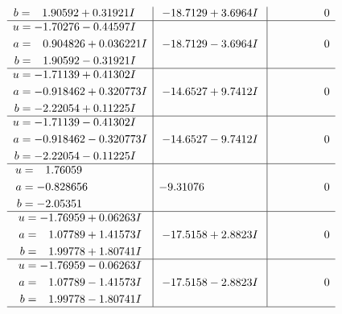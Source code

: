 \documentclass[1p]{elsarticle_modified}
\theoremstyle{definition}
\begin{document}
$$\begin{array}{c|c|c}
\begin{aligned}
b &= \phantom{-}1.90592 + 0.31921 I\end{aligned}
 & -18.7129 + 3.6964 I & \phantom{-0.000000 } 0 \\ \hline\begin{aligned}
u &= -1.70276 - 0.44597 I \\
a &= \phantom{-}0.904826 + 0.036221 I \\
b &= \phantom{-}1.90592 - 0.31921 I\end{aligned}
 & -18.7129 - 3.6964 I & \phantom{-0.000000 } 0 \\ \hline\begin{aligned}
u &= -1.71139 + 0.41302 I \\
a &= -0.918462 + 0.320773 I \\
b &= -2.22054 + 0.11225 I\end{aligned}
 & -14.6527 + 9.7412 I & \phantom{-0.000000 } 0 \\ \hline\begin{aligned}
u &= -1.71139 - 0.41302 I \\
a &= -0.918462 - 0.320773 I \\
b &= -2.22054 - 0.11225 I\end{aligned}
 & -14.6527 - 9.7412 I & \phantom{-0.000000 } 0 \\ \hline\begin{aligned}
u &= \phantom{-}1.76059\phantom{ +0.000000I} \\
a &= -0.828656\phantom{ +0.000000I} \\
b &= -2.05351\phantom{ +0.000000I}\end{aligned}
 & -9.31076\phantom{ +0.000000I} & \phantom{-0.000000 } 0 \\ \hline\begin{aligned}
u &= -1.76959 + 0.06263 I \\
a &= \phantom{-}1.07789 + 1.41573 I \\
b &= \phantom{-}1.99778 + 1.80741 I\end{aligned}
 & -17.5158 + 2.8823 I & \phantom{-0.000000 } 0 \\ \hline\begin{aligned}
u &= -1.76959 - 0.06263 I \\
a &= \phantom{-}1.07789 - 1.41573 I \\
b &= \phantom{-}1.99778 - 1.80741 I\end{aligned}
 & -17.5158 - 2.8823 I & \phantom{-0.000000 } 0\\
 \hline 
 \end{array}$$\newpage$$\begin{array}{c|c|c}  

\end{array}$$
\end{document}

